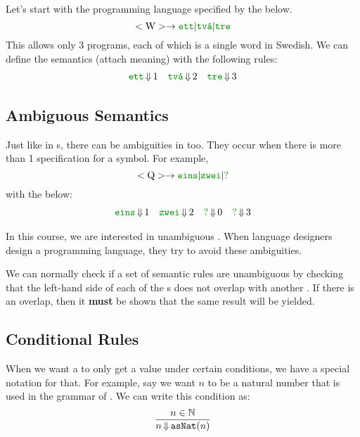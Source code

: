 Let's start with the programming language specified by the  below.
\begin{equation*}
  \Nonterminal{W} \rightarrow \textcolor{Green4}{\mathtt{ett}} \vert \textcolor{Green4}{\text{\texttt{tv\r{a}}}} \vert \textcolor{Green4}{\mathtt{tre}}
\end{equation*}
This allows only 3 programs, each of which is a single word in Swedish.
We can define the semantics (attach meaning) with the following rules:
\begin{align*}
  \textcolor{Green4}{\mathtt{ett}} &\EvaluatesTo 1 & \textcolor{Green4}{\text{\texttt{tv\r{a}}}} &\EvaluatesTo 2 & \textcolor{Green4}{\mathtt{tre}} &\EvaluatesTo 3 \\
\end{align*}

\subsection{Ambiguous Semantics}\label{subsec:Ambiguous_Semantics}
Just like in s, there can be ambiguities in  too.
They occur when there is more than 1 specification for a symbol.
For example,
\begin{equation*}
  \Nonterminal{Q} \rightarrow \textcolor{Green4}{\mathtt{eins}} \vert \textcolor{Green4}{\mathtt{zwei}} \vert \textcolor{Green4}{\mathtt{?}}
\end{equation*}
with the  below:
\begin{align*}
  \textcolor{Green4}{\mathtt{eins}} &\EvaluatesTo 1 & \textcolor{Green4}{\mathtt{zwei}} &\EvaluatesTo 2 & \textcolor{Green4}{\mathtt{?}} &\EvaluatesTo 0 & \textcolor{Green4}{\mathtt{?}} &\EvaluatesTo 3 \\
\end{align*}

In this course, we are interested in unambiguous .
When language designers design a programming language, they try to avoid these ambiguities.

We can normally check if a set of semantic rules are unambiguous by checking that the left-hand side of each of the s does not overlap with another .
If there is an overlap, then it \textbf{must} be shown that the same result will be yielded.

\subsection{Conditional Rules}\label{subsec:Conditional_Rules}
When we want a  to only get a value under certain conditions, we have a special notation for that.
For example, say we want $n$ to be a natural number that is used in the grammar of .
We can write this condition as:
\begin{equation}\label{eq:Conditional_Rules}
  \frac{n \in \operatorname{\mathbb{N}}}{n \operatorname{\Downarrow} \mathtt{asNat}(n)}
\end{equation}

